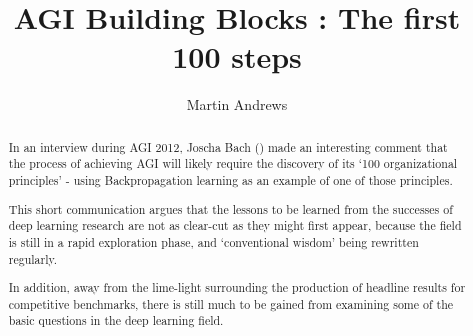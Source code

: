 \documentclass[citeauthoryear]{llncs}
\begin{document}
%
\frontmatter          %
%
\pagestyle{headings}  %
%
\mainmatter              %
%
\title{AGI Building Blocks : The first 100 steps}
%
%
\author{Martin Andrews}
%
%
%

\maketitle              %

\begin{abstract}



In an interview  during AGI 2012, Joscha Bach (\cite{Joscha-Bach-2012-interview}) 
made an interesting comment that the process of achieving 
AGI will likely require the discovery of its `100 organizational principles' - 
using Backpropagation learning as an example of one of those principles.  

This short communication argues that the lessons to be learned from 
the successes of deep learning research are not as clear-cut as they might first appear,
because the field is still in a rapid exploration phase, and `conventional wisdom' 
being rewritten regularly.

In addition, away from the lime-light surrounding the production of 
headline results for competitive benchmarks, there is still much to be 
gained from examining some of the basic questions in the deep learning field.

\end{abstract}
%
\end{document}
